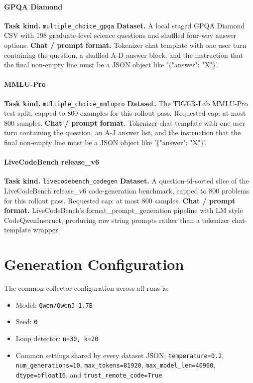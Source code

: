 \documentclass[11pt]{article}
\begin{document}
\paragraph{GPQA Diamond}
\textbf{Task kind.} \texttt{multiple\_choice\_gpqa}
\textbf{Dataset.} A local staged GPQA Diamond CSV with 198 graduate-level science questions and shuffled four-way answer options.
\textbf{Chat / prompt format.} Tokenizer chat template with one user turn containing the question, a shuffled A-D answer block, and the instruction that the final non-empty line must be a JSON object like '\{"answer": "X"\}'.

\paragraph{MMLU-Pro}
\textbf{Task kind.} \texttt{multiple\_choice\_mmlupro}
\textbf{Dataset.} The TIGER-Lab MMLU-Pro test split, capped to 800 examples for this rollout pass. Requested cap: at most 800 samples.
\textbf{Chat / prompt format.} Tokenizer chat template with one user turn containing the question, an A-J answer list, and the instruction that the final non-empty line must be a JSON object like '\{"answer": "X"\}'.

\paragraph{LiveCodeBench release\_v6}
\textbf{Task kind.} \texttt{livecodebench\_codegen}
\textbf{Dataset.} A question-id-sorted slice of the LiveCodeBench release\_v6 code-generation benchmark, capped to 800 problems for this rollout pass. Requested cap: at most 800 samples.
\textbf{Chat / prompt format.} LiveCodeBench's format\_prompt\_generation pipeline with LM style CodeQwenInstruct, producing raw string prompts rather than a tokenizer chat-template wrapper.

\section*{Generation Configuration}
The common collector configuration across all runs is:
\begin{itemize}[leftmargin=1.5em]
\item Model: \texttt{Qwen/Qwen3-1.7B}
\item Seed: \texttt{0}
\item Loop detector: \texttt{n=30, k=20}
\item Common settings shared by every dataset JSON: \texttt{temperature=0.2}, \texttt{num\_generations=10}, \texttt{max\_tokens=81920}, \texttt{max\_model\_len=40960}, \texttt{dtype=bfloat16}, and \texttt{trust\_remote\_code=True}
\end{itemize}
\end{document}
